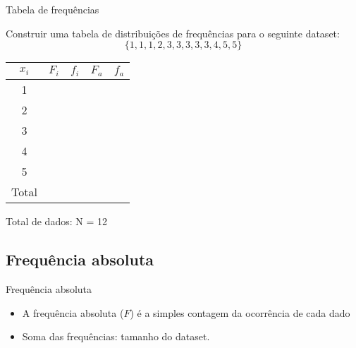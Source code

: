 \documentclass{beamer}
\begin{document}
\begin{frame}{Tabela de frequências}
  \begin{example}
    Construir uma tabela de distribuições de frequências para o
    seguinte dataset:
    $$ \{ 1,1,1,2,3,3,3,3,3,4,5,5 \}$$
    \begin{center}
      \begin{tabular}[h]{|c|c|c|c|c|}
        \hline
        $x_i$ & $F_i$ & $f_i$ & $F_a$ & $f_a$\\
        \hline
        1 & & & & \\
        \hline
        2 & & & & \\
        \hline
        3 & & & & \\
        \hline
        4 & & & & \\
        \hline
        5 & & & & \\
        \hline
        \hline
        Total & & & & \\
        \hline
      \end{tabular}
      Total de dados: N = 12
    \end{center}
  \end{example}
\end{frame}

\subsection{Frequência absoluta}

\begin{frame}{Frequência absoluta}
  \begin{itemize}
  \item A frequência absoluta ($F$) é a simples contagem da ocorrência
    de cada dado
  \item Soma das frequências: tamanho do dataset.
  \end{itemize}
\end{frame}
\end{document}
